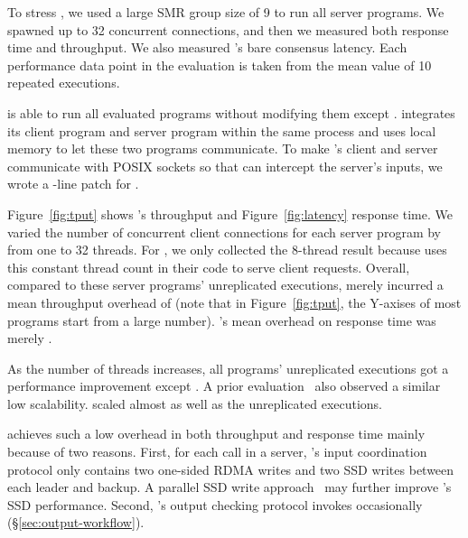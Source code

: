 To stress \xxx, we used a large SMR group size of 9 to run all server programs. 
We spawned up to 32 concurrent connections, and then we measured both response 
time and throughput. We also measured \xxx's bare consensus latency. Each 
performance data point in the evaluation is taken from the mean value of 
10 repeated executions.


\xxx is able to run all \nprog evaluated programs without modifying them except
\calvin. \calvin integrates its client program and server program within the
same process and uses local memory to let these two programs communicate. To
make \calvin's client and server communicate with POSIX sockets so that \xxx
can intercept the server's inputs, we wrote a \nlinescalvin-line patch for
\calvin.

Figure~\ref{fig:tput} shows \xxx's throughput and Figure~\ref{fig:latency}
response time. We varied the number of concurrent client connections for each
server program by from one to 32 threads. For \calvin, we only collected the
8-thread result because \calvin uses this constant thread count in their code
to serve client requests. Overall, compared to these server programs'
unreplicated executions, \xxx merely incurred a mean throughput overhead of
\tputoverhead (note that in Figure~\ref{fig:tput}, the Y-axises of most programs
start from a large number). \xxx's mean overhead on response time was merely
\latencyoverhead.

As the number of threads increases, all programs' unreplicated executions
got a performance improvement except \memcached. A prior
evaluation~\cite{rex:eurosys14} also observed a similar \memcached low
scalability. \xxx scaled almost as well as the unreplicated executions.

\xxx achieves such a low overhead in both throughput and response time mainly
because of two reasons. First, for each \recv call in a server, \xxx's input
coordination protocol only contains two one-sided RDMA writes and two SSD writes
between each leader and backup. A parallel SSD write
approach~\cite{Bessani:usenix13} may further improve \xxx's SSD performance.
Second, \xxx's output checking protocol invokes occasionally
(\S\ref{sec:output-workflow}).

